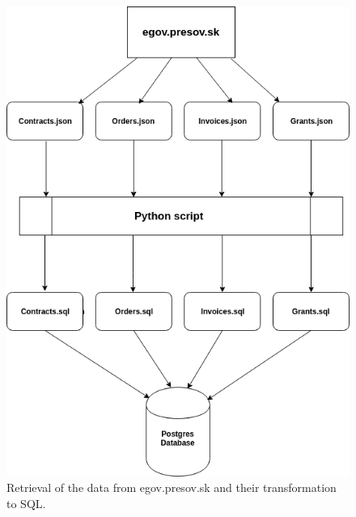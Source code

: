 \documentclass[thesis=B,english]{sprlajur-slovakopendata}[2018/05/12]
\begin{document}
{	\begin{figure}[H]
		\begin{center}
			\includegraphics[scale=0.6]{pictures/jsonToDb.png}
			\caption{Retrieval of the data from egov.presov.sk and their transformation to SQL.}
			\label{fig:jsonToDb}
		\end{center}
	\end{figure}
	
}
\end{document}

